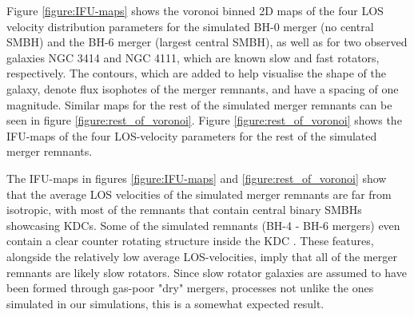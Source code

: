 \documentclass[english, twoside]{HYgradu}
\begin{document}
Figure \ref{figure:IFU-maps} shows the voronoi binned 2D maps of the four LOS velocity distribution parameters for the simulated BH-0 merger (no central SMBH) and the BH-6 merger (largest central SMBH), as well as for two observed galaxies NGC 3414 and NGC 4111, which are known slow and fast rotators, respectively. The contours, which are added to help visualise the shape of the galaxy, denote flux isophotes of the merger remnants, and have a spacing of one magnitude. Similar maps for the rest of the simulated merger remnants can be seen in figure \ref{figure:rest_of_voronoi}. Figure \ref{figure:rest_of_voronoi} shows the IFU-maps of the four LOS-velocity parameters for the rest of the simulated merger remnants.

The IFU-maps in figures \ref{figure:IFU-maps} and \ref{figure:rest_of_voronoi} show that the average LOS velocities of the simulated merger remnants are far from isotropic, with most of the remnants that contain central binary SMBHs showcasing KDCs. Some of the simulated remnants (BH-4 - BH-6 mergers) even contain a clear counter rotating structure inside the KDC \citep{Rantala2019}. These features, alongside the relatively low average LOS-velocities, imply that all of the merger remnants are likely slow rotators. Since slow rotator galaxies are assumed to have been formed through gas-poor "dry" mergers, processes not unlike the ones simulated in our simulations, this is a somewhat expected result.
\end{document}
